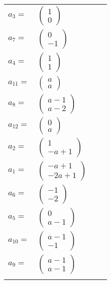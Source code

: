 \documentclass[1p]{elsarticle_modified}
\theoremstyle{definition}
\begin{document}
\begin{tabular}{m{7pt} m{180pt} m{7pt} m{180pt} }
\flushright $a_{3}=$&$\begin{pmatrix}1\\0\end{pmatrix}$ \\
\flushright $a_{7}=$&$\begin{pmatrix}0\\-1\end{pmatrix}$ \\
\flushright $a_{4}=$&$\begin{pmatrix}1\\1\end{pmatrix}$ \\
\flushright $a_{11}=$&$\begin{pmatrix}a\\a\end{pmatrix}$ \\
\flushright $a_{8}=$&$\begin{pmatrix}a-1\\a-2\end{pmatrix}$ \\
\flushright $a_{12}=$&$\begin{pmatrix}0\\a\end{pmatrix}$ \\
\flushright $a_{2}=$&$\begin{pmatrix}1\\- a+1\end{pmatrix}$ \\
\flushright $a_{1}=$&$\begin{pmatrix}- a+1\\-2 a+1\end{pmatrix}$ \\
\flushright $a_{6}=$&$\begin{pmatrix}-1\\-2\end{pmatrix}$ \\
\flushright $a_{5}=$&$\begin{pmatrix}0\\a-1\end{pmatrix}$ \\
\flushright $a_{10}=$&$\begin{pmatrix}a-1\\-1\end{pmatrix}$ \\
\flushright $a_{9}=$&$\begin{pmatrix}a-1\\a-1\end{pmatrix}$\\&\end{tabular}
\end{document}
